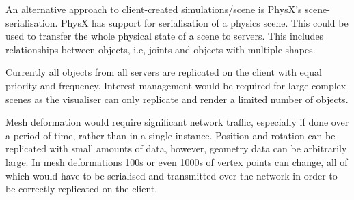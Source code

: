 An alternative approach to client-created simulations/scene is PhysX's scene-serialisation. PhysX has support for serialisation of a physics scene. This could be used to transfer the whole physical state of a scene to servers. This includes relationships between objects, i.e, joints and objects with multiple shapes.

Currently all objects from all servers are replicated on the client with equal priority and frequency. Interest management would be required for large complex scenes as the visualiser can only replicate and render a limited number of objects.

Mesh deformation would require significant network traffic, especially if done over a period of time, rather than in a single instance. Position and rotation can be replicated with small amounts of data, however, geometry data can be arbitrarily large. In mesh deformations 100s or even 1000s of vertex points can change, all of which would have to be serialised and transmitted over the network in order to be correctly replicated on the client.

